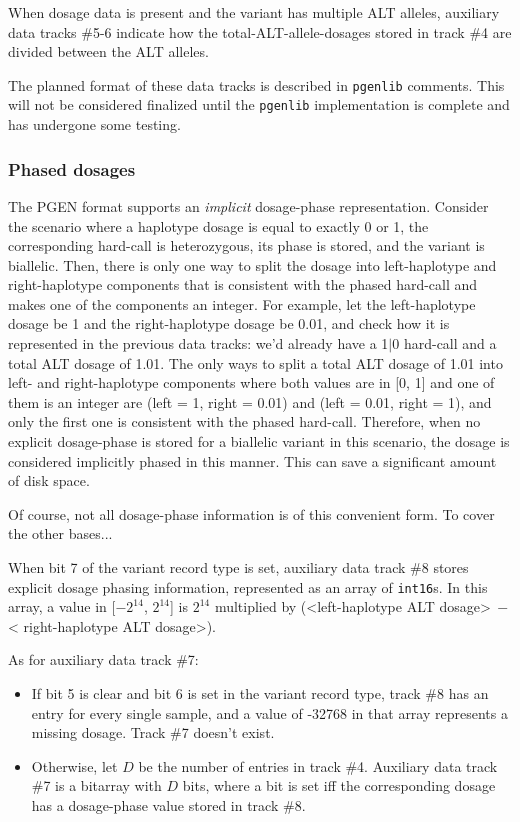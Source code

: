 \documentclass[8pt]{article}
\begin{document}
When dosage data is present and the variant has multiple ALT alleles, auxiliary
data tracks \#5-6 indicate how the total-ALT-allele-dosages stored in track \#4
are divided between the ALT alleles.

The planned format of these data tracks is described in
\texttt{pgenlib} comments.  This will not be considered finalized
until the \texttt{pgenlib} implementation is complete and has undergone some
testing.

\subsubsection{Phased dosages}

The PGEN format supports an \textit{implicit} dosage-phase representation.
Consider the scenario where a haplotype dosage is equal to exactly 0 or 1, the
corresponding hard-call is heterozygous, its phase is stored, and the variant
is biallelic.  Then, there is only one way to split the dosage into
left-haplotype and right-haplotype components that is consistent with the
phased hard-call and makes one of the components an integer.  For example, let
the left-haplotype dosage be 1 and the right-haplotype dosage be 0.01, and
check how it is represented in the previous data tracks: we'd already have a
1$|$0 hard-call and a total ALT dosage of 1.01.  The only ways to split a total
ALT dosage of 1.01 into left- and right-haplotype components where both values
are in [0, 1] and one of them is an integer are (left = 1, right = 0.01) and
(left = 0.01, right = 1), and only the first one is consistent with the phased
hard-call.  Therefore, when no explicit dosage-phase is stored for a biallelic
variant in this scenario, the dosage is considered implicitly phased in this
manner.  This can save a significant amount of disk space.

Of course, not all dosage-phase information is of this convenient form.  To
cover the other bases...

When bit 7 of the variant record type is set, auxiliary data track \#8 stores
explicit dosage phasing information, represented as an array of
\texttt{int16}s.  In this array, a value in [$-2^{14}$, $2^{14}$] is $2^{14}$
multiplied by (\textless left-haplotype ALT dosage\textgreater $\>-$ \textless
right-haplotype ALT dosage\textgreater ).

As for auxiliary data track \#7:

\begin{itemize}
\item If bit 5 is clear and bit 6 is set in the variant record type, track \#8
  has an entry for every single sample, and a value of -32768 in that array
  represents a missing dosage.  Track \#7 doesn't exist.
\item Otherwise, let $D$ be the number of entries in track \#4.  Auxiliary data
  track \#7 is a bitarray with $D$ bits, where a bit is set iff the
  corresponding dosage has a dosage-phase value stored in track \#8.
\end{itemize}
\end{document}
